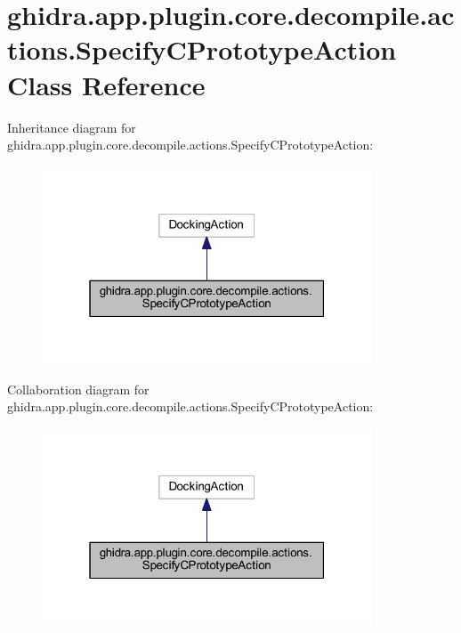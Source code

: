 \hypertarget{classghidra_1_1app_1_1plugin_1_1core_1_1decompile_1_1actions_1_1_specify_c_prototype_action}{}\section{ghidra.\+app.\+plugin.\+core.\+decompile.\+actions.\+Specify\+C\+Prototype\+Action Class Reference}
\label{classghidra_1_1app_1_1plugin_1_1core_1_1decompile_1_1actions_1_1_specify_c_prototype_action}


Inheritance diagram for ghidra.\+app.\+plugin.\+core.\+decompile.\+actions.\+Specify\+C\+Prototype\+Action\+:
\nopagebreak
\begin{figure}[H]
\begin{center}
\leavevmode
\includegraphics[width=277pt]{classghidra_1_1app_1_1plugin_1_1core_1_1decompile_1_1actions_1_1_specify_c_prototype_action__inherit__graph}
\end{center}
\end{figure}


Collaboration diagram for ghidra.\+app.\+plugin.\+core.\+decompile.\+actions.\+Specify\+C\+Prototype\+Action\+:
\nopagebreak
\begin{figure}[H]
\begin{center}
\leavevmode
\includegraphics[width=277pt]{classghidra_1_1app_1_1plugin_1_1core_1_1decompile_1_1actions_1_1_specify_c_prototype_action__coll__graph}
\end{center}
\end{figure}
